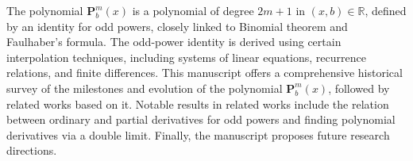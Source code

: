 The polynomial $\mathbf{P}^m_b(x)$ is a polynomial of degree $2m+1$ in $(x,b) \in \mathbb{R}$,
defined by an identity for odd powers, closely linked to Binomial theorem and Faulhaber's formula.
The odd-power identity is derived using certain interpolation techniques,
including systems of linear equations, recurrence relations, and finite differences.
This manuscript offers a comprehensive historical survey of the milestones and evolution
of the polynomial $\mathbf{P}^m_b(x)$, followed by related works based on it.
Notable results in related works include the relation between ordinary and partial derivatives
for odd powers and finding polynomial derivatives via a double limit.
Finally, the manuscript proposes future research directions.

